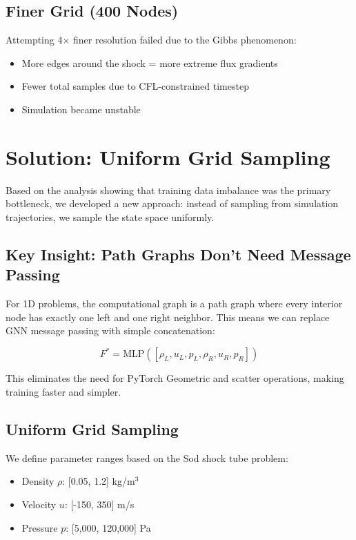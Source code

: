 \documentclass[11pt,a4paper]{article}
\begin{document}
\subsection{Finer Grid (400 Nodes)}

Attempting 4$\times$ finer resolution failed due to the Gibbs phenomenon:
\begin{itemize}
    \item More edges around the shock = more extreme flux gradients
    \item Fewer total samples due to CFL-constrained timestep
    \item Simulation became unstable
\end{itemize}

\section{Solution: Uniform Grid Sampling}

Based on the analysis showing that training data imbalance was the primary bottleneck, we developed a new approach: instead of sampling from simulation trajectories, we sample the state space uniformly.

\subsection{Key Insight: Path Graphs Don't Need Message Passing}

For 1D problems, the computational graph is a path graph where every interior node has exactly one left and one right neighbor. This means we can replace GNN message passing with simple concatenation:

\begin{equation}
    F^* = \text{MLP}([\rho_L, u_L, p_L, \rho_R, u_R, p_R])
\end{equation}

This eliminates the need for PyTorch Geometric and scatter operations, making training faster and simpler.

\subsection{Uniform Grid Sampling}

We define parameter ranges based on the Sod shock tube problem:
\begin{itemize}
    \item Density $\rho$: [0.05, 1.2] kg/m$^3$
    \item Velocity $u$: [-150, 350] m/s
    \item Pressure $p$: [5,000, 120,000] Pa
\end{itemize}
\end{document}
